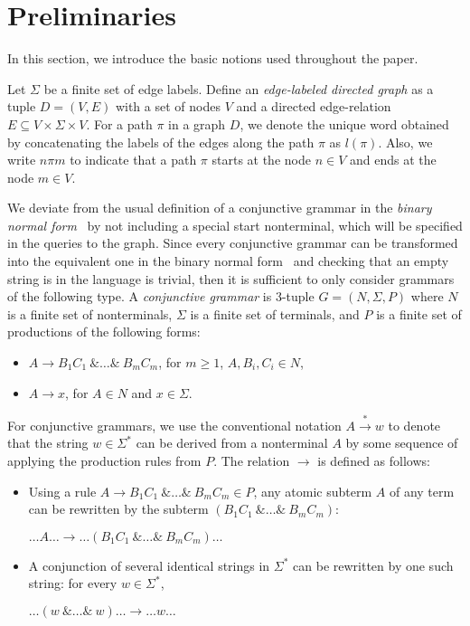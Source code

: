 \section{Preliminaries} \label{section_preliminaries}
In this section, we introduce the basic notions used throughout the paper.

Let $\Sigma$ be a finite set of edge labels. Define an \textit{edge-labeled directed graph} as a tuple $D = (V, E)$ with a set of nodes $V$ and a directed edge-relation $E \subseteq V \times \Sigma \times V$.  For a path $\pi$ in a graph $D$, we denote the unique word obtained by concatenating the labels of the edges along the path $\pi$ as $l(\pi)$. Also, we write $n \pi m$ to indicate that a path $\pi$ starts at the node $n \in V$ and ends at the node $m \in V$.

We deviate from the usual definition of a conjunctive grammar in the \textit{binary normal form}~\cite{okhotinConjAndBool} by not including a special start nonterminal, which will be specified in the queries to the graph. Since every conjunctive grammar can be transformed into the equivalent one in the binary normal form~\cite{okhotinConjAndBool} and checking that an empty string is in the language is trivial, then it is sufficient to only consider grammars of the following type. A \textit{conjunctive grammar} is 3-tuple $G = (N, \Sigma, P)$ where $N$ is a finite set of nonterminals, $\Sigma$ is a finite set of terminals, and $P$ is a finite set of productions of the following forms:

\begin{itemize}
    \item $A \rightarrow B_1 C_1~\& \ldots \&~B_m C_m$, for $m \geq 1$, $A,B_i,C_i \in N$,
    \item $A \rightarrow x$, for $A \in N$ and $x \in \Sigma$.   
\end{itemize}

For conjunctive grammars, we use the conventional notation $A \xrightarrow{*} w$ to denote that the string $w \in \Sigma^*$ can be derived from a nonterminal $A$ by some sequence of applying the production rules from $P$. The relation $\rightarrow$ is defined as follows:
\begin{itemize}
    \item Using a rule $A \rightarrow B_1 C_1~\& \ldots \&~B_m C_m \in P$, any atomic subterm $A$ of any term can be rewritten by the subterm $(B_1 C_1 ~\& \ldots \&~ B_m C_m)$:
    \begin{center}
        $\ldots A \ldots \rightarrow \ldots (B_1 C_1~\& \ldots \&~B_m C_m) \ldots$
    \end{center}
    \item A conjunction of several identical strings in $\Sigma^*$ can be rewritten by one such string: for every $w \in \Sigma^*$,
    \begin{center}
        $\ldots (w~\& \ldots \&~w) \ldots \rightarrow \ldots w \ldots$
    \end{center}
    
\end{itemize}

